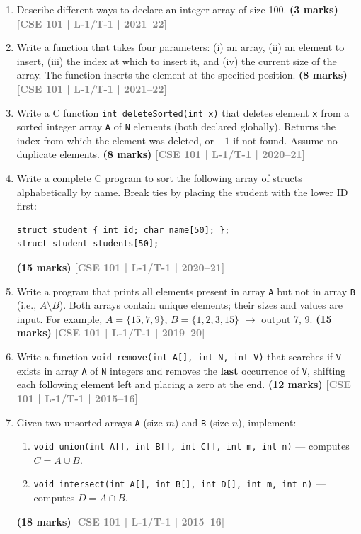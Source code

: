 \documentclass[12pt,a3paper]{article}
\newcommand{\yr}[1]{\hfill\textcolor{gray}{\small\textbf{[#1]}}}
\newcommand{\mk}[1]{\textcolor{orange!70!black}{\small\textbf{(#1 marks)}}}
\begin{document}
\begin{enumerate}
\item Describe different ways to declare an integer array of size 100.
\mk{3} \yr{CSE 101 | L-1/T-1 | 2021--22}

\item Write a function that takes four parameters: (i) an array, (ii) an element to insert, (iii) the index at which to insert it, and (iv) the current size of the array. The function inserts the element at the specified position.
\mk{8} \yr{CSE 101 | L-1/T-1 | 2021--22}

\item Write a C function \texttt{int deleteSorted(int x)} that deletes element \texttt{x} from a sorted integer array \texttt{A} of \texttt{N} elements (both declared globally). Returns the index from which the element was deleted, or $-1$ if not found. Assume no duplicate elements.
\mk{8} \yr{CSE 101 | L-1/T-1 | 2020--21}

\item Write a complete C program to sort the following array of structs alphabetically by name. Break ties by placing the student with the lower ID first:
 
\begin{lstlisting}
struct student { int id; char name[50]; };
struct student students[50];
\end{lstlisting}
\mk{15} \yr{CSE 101 | L-1/T-1 | 2020--21}

\item Write a program that prints all elements present in array \texttt{A} but not in array \texttt{B} (i.e., $A \setminus B$). Both arrays contain unique elements; their sizes and values are input. For example, $A=\{15,7,9\}$, $B=\{1,2,3,15\}$ $\to$ output 7, 9.
\mk{15} \yr{CSE 101 | L-1/T-1 | 2019--20}

\item Write a function \texttt{void remove(int A[], int N, int V)} that searches if \texttt{V} exists in array \texttt{A} of \texttt{N} integers and removes the \textbf{last} occurrence of \texttt{V}, shifting each following element left and placing a zero at the end.
\mk{12} \yr{CSE 101 | L-1/T-1 | 2015--16}

\item Given two unsorted arrays \texttt{A} (size $m$) and \texttt{B} (size $n$), implement:
\begin{enumerate}
  \item \texttt{void union(int A[], int B[], int C[], int m, int n)} --- computes $C = A \cup B$.
  \item \texttt{void intersect(int A[], int B[], int D[], int m, int n)} --- computes $D = A \cap B$.
\end{enumerate}
\mk{18} \yr{CSE 101 | L-1/T-1 | 2015--16}


\end{enumerate}
\end{document}
